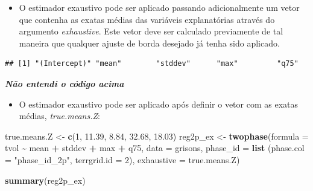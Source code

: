 \documentclass[
]{article}
\newenvironment{Shaded}{\begin{snugshade}}{\end{snugshade}}
\newcommand{\AttributeTok}[1]{\textcolor[rgb]{0.13,0.29,0.53}{#1}}
\newcommand{\ConstantTok}[1]{\textcolor[rgb]{0.56,0.35,0.01}{#1}}
\newcommand{\DecValTok}[1]{\textcolor[rgb]{0.00,0.00,0.81}{#1}}
\newcommand{\FloatTok}[1]{\textcolor[rgb]{0.00,0.00,0.81}{#1}}
\newcommand{\FunctionTok}[1]{\textcolor[rgb]{0.13,0.29,0.53}{\textbf{#1}}}
\newcommand{\NormalTok}[1]{#1}
\newcommand{\OtherTok}[1]{\textcolor[rgb]{0.56,0.35,0.01}{#1}}
\newcommand{\SpecialCharTok}[1]{\textcolor[rgb]{0.81,0.36,0.00}{\textbf{#1}}}
\newcommand{\StringTok}[1]{\textcolor[rgb]{0.31,0.60,0.02}{#1}}
\providecommand{\tightlist}{%
  \setlength{\itemsep}{0pt}\setlength{\parskip}{0pt}}
\begin{document}
\begin{itemize}
\tightlist
\item
  O estimador exaustivo pode ser aplicado passando adicionalmente um
  vetor que contenha as exatas médias das variáveis explanatórias
  através do argumento \emph{exhaustive}. Este vetor deve ser calculado
  previamente de tal maneira que qualquer ajuste de borda desejado já
  tenha sido aplicado.
\end{itemize}

\begin{Shaded}
\end{Shaded}

\begin{verbatim}
## [1] "(Intercept)" "mean"        "stddev"      "max"         "q75"
\end{verbatim}

\textbf{\emph{Não entendi o código acima}}

\begin{itemize}
\tightlist
\item
  O estimador exaustivo pode ser aplicado após definir o vetor com as
  exatas médias, \emph{true.means.Z}:
\end{itemize}

\begin{Shaded}
\begin{Highlighting}[]
\NormalTok{true.means.Z }\OtherTok{\textless{}{-}} \FunctionTok{c}\NormalTok{(}\DecValTok{1}\NormalTok{, }\FloatTok{11.39}\NormalTok{, }\FloatTok{8.84}\NormalTok{, }\FloatTok{32.68}\NormalTok{, }\FloatTok{18.03}\NormalTok{)}
\NormalTok{reg2p\_ex }\OtherTok{\textless{}{-}} \FunctionTok{twophase}\NormalTok{(}\AttributeTok{formula =}\NormalTok{ tvol }\SpecialCharTok{\textasciitilde{}}\NormalTok{ mean }\SpecialCharTok{+}\NormalTok{ stddev }\SpecialCharTok{+}\NormalTok{ max }\SpecialCharTok{+}\NormalTok{ q75,}
                     \AttributeTok{data =}\NormalTok{ grisons, }\AttributeTok{phase\_id =} \FunctionTok{list}\NormalTok{ (}\AttributeTok{phase.col =} \StringTok{"phase\_id\_2p"}\NormalTok{,}
                      \AttributeTok{terrgrid.id =} \DecValTok{2}\NormalTok{), }\AttributeTok{exhaustive =}\NormalTok{ true.means.Z)}

\FunctionTok{summary}\NormalTok{(reg2p\_ex)}
\end{Highlighting}
\end{Shaded}
\end{document}
